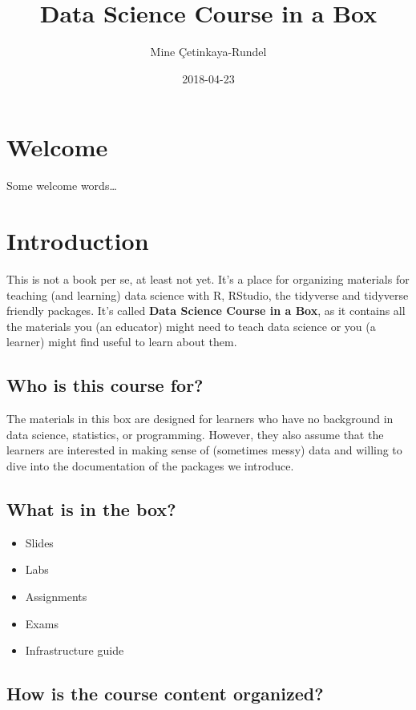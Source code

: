 \documentclass[]{book}
\title{Data Science Course in a Box}
\author{Mine Çetinkaya-Rundel}
\date{2018-04-23}
\providecommand{\tightlist}{%
  \setlength{\itemsep}{0pt}\setlength{\parskip}{0pt}}
\theoremstyle{definition}
\theoremstyle{definition}
\theoremstyle{definition}
\theoremstyle{remark}
\begin{document}
\maketitle

{
\setcounter{tocdepth}{1}
\tableofcontents
}
\chapter*{Welcome}\label{welcome}

Some welcome words\ldots{}

\chapter{Introduction}\label{intro}

This is not a book per se, at least not yet. It's a place for organizing
materials for teaching (and learning) data science with R, RStudio, the
tidyverse and tidyverse friendly packages. It's called \textbf{Data
Science Course in a Box}, as it contains all the materials you (an
educator) might need to teach data science or you (a learner) might find
useful to learn about them.

\section{Who is this course for?}\label{who-is-this-course-for}

The materials in this box are designed for learners who have no
background in data science, statistics, or programming. However, they
also assume that the learners are interested in making sense of
(sometimes messy) data and willing to dive into the documentation of the
packages we introduce.

\section{What is in the box?}\label{what-is-in-the-box}

\begin{itemize}
\tightlist
\item
  Slides
\item
  Labs
\item
  Assignments
\item
  Exams
\item
  Infrastructure guide
\end{itemize}

\section{How is the course content
organized?}\label{how-is-the-course-content-organized}
\end{document}
